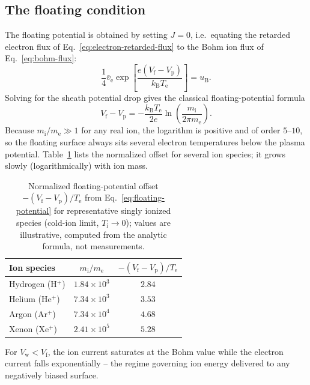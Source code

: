 \subsection{The floating condition}

The floating potential is obtained by setting $J = 0$, i.e.\ equating the retarded electron flux of Eq.~\eqref{eq:electron-retarded-flux} to the Bohm ion flux of Eq.~\eqref{eq:bohm-flux}:
\begin{equation}
\frac{1}{4} \bar{v}_{\mathrm{e}} \exp\!\left[ \frac{e (V_{\mathrm{f}} - V_{\mathrm{p}})}{k_{\mathrm{B}} T_{\mathrm{e}}} \right] = u_{\mathrm{B}}.
\end{equation}
Solving for the sheath potential drop gives the classical floating-potential formula
\begin{equation}
V_{\mathrm{f}} - V_{\mathrm{p}} = -\frac{k_{\mathrm{B}} T_{\mathrm{e}}}{2e} \ln\!\left( \frac{m_{\mathrm{i}}}{2\pi m_{\mathrm{e}}} \right).
\label{eq:floating-potential}
\end{equation}
Because $m_{\mathrm{i}}/m_{\mathrm{e}} \gg 1$ for any real ion, the logarithm is positive and of order $5$--$10$, so the floating surface always sits several electron temperatures below the plasma potential. Table~\ref{tab:floating-potentials} lists the normalized offset for several ion species; it grows slowly (logarithmically) with ion mass.

\begin{table}[htbp]
\centering
\caption{Normalized floating-potential offset $-(V_{\mathrm{f}} - V_{\mathrm{p}})/T_{\mathrm{e}}$ from Eq.~\eqref{eq:floating-potential} for representative singly ionized species (cold-ion limit, $T_{\mathrm{i}} \to 0$); values are illustrative, computed from the analytic formula, not measurements.}
\label{tab:floating-potentials}
\begin{tabular}{lcc}
\toprule
Ion species & $m_{\mathrm{i}}/m_{\mathrm{e}}$ & $-(V_{\mathrm{f}}-V_{\mathrm{p}})/T_{\mathrm{e}}$ \\
\midrule
Hydrogen (H$^{+}$) & $1.84\times10^{3}$ & $2.84$ \\
Helium (He$^{+}$) & $7.34\times10^{3}$ & $3.53$ \\
Argon (Ar$^{+}$) & $7.34\times10^{4}$ & $4.68$ \\
Xenon (Xe$^{+}$) & $2.41\times10^{5}$ & $5.28$ \\
\bottomrule
\end{tabular}
\end{table}

For $V_{\mathrm{w}} < V_{\mathrm{f}}$, the ion current saturates at the Bohm value while the electron current falls exponentially -- the regime governing ion energy delivered to any negatively biased surface.


